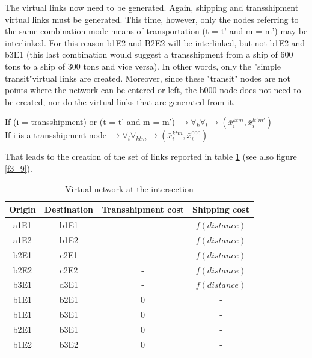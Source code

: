 The virtual links now need to be generated.  Again, shipping and transshipment virtual links must be generated.  This time, however, only the nodes
referring to the same combination mode-means of transportation (t = t' and m =
m') may be interlinked.  For this reason b1E2 and B2E2 will be interlinked, but
not b1E2 and b3E1 (this last combination would suggest a transshipment from a
ship of 600 tons to a ship of 300 tons and vice versa).  In other words, only
the "simple transit"virtual links are created.  Moreover, since these "transit"
nodes are not points where the network can be entered or left, the b000 node
does not need to be created, nor do the virtual links that are generated from it.


\begin{center}
If (i =  transshipment) or (t = t' and m = m') $\rightarrow
\forall_k \forall_{l} \rightarrow(\bar x_i^{ktm},
\bar x_i^{lt'm'})$\\
If i is a transshipment node $\rightarrow \forall_i
\forall_{ktm}
\rightarrow (\bar x_i^{ktm}, \bar x_i^{000})$
\end{center}

That leads to the creation of the set of links reported in table \ref{tab3_7}
(see also figure \ref{f3_9}).


\begin{table}[htbp]
\begin{center}
\begin{tabular}{cccc}
\hline

Origin & Destination & Transshipment cost & Shipping cost\\
\hline
a1E1 & b1E1 & - & $f(distance)$\\

a1E2 & b1E2 & - & $f(distance)$\\

b2E1 & c2E1 & - & $f(distance)$\\

b2E2 & c2E2 & - & $f(distance)$\\

b3E1 & d3E1 & - & $f(distance)$\\

b1E1 & b2E1 & 0 & -\\

b1E1 & b3E1 & 0 & -\\

b2E1 & b3E1 & 0 & -\\

b1E2 & b3E2 & 0 & -\\
\hline
\end{tabular}
\caption{\label{tab3_7} Virtual network at the intersection}
\end{center}
\end{table}


